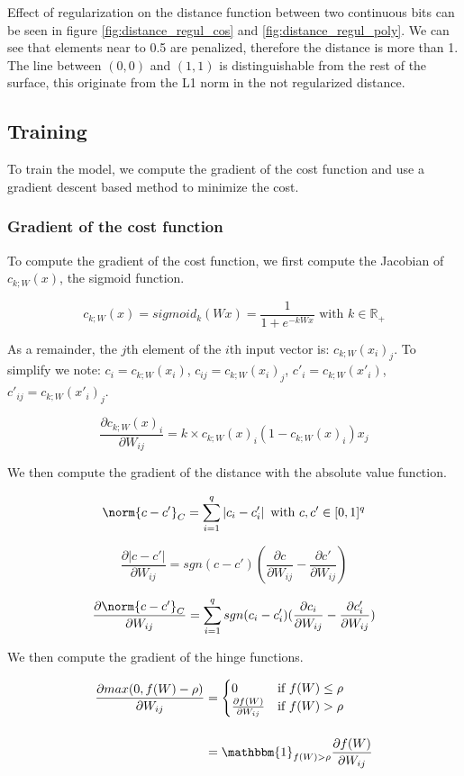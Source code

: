 Effect of regularization on the distance function between two continuous bits can be seen in figure \ref{fig:distance_regul_cos} and \ref{fig:distance_regul_poly}. We can see that elements near to 0.5 are penalized, therefore the distance is more than 1. The line between $(0, 0)$ and $(1, 1)$ is distinguishable from the rest of the surface, this originate from the L1 norm in the not regularized distance.

\subsection{Training}
To train the model, we compute the gradient of the cost function and use a gradient descent based method to minimize the cost.

\subsubsection{Gradient of the cost function}
To compute the gradient of the cost function, we first compute the Jacobian of $c_{k;W}(x)$, the sigmoid function.

\[c_{k;W}(x) = sigmoid_k(Wx) = \frac{1}{1 + e^{-kWx}} \text{ with } k \in \mathbb{R}_+\]

As a remainder, the $j$th element of the $i$th input vector is: $c_{k;W}(x_i)_j$. To simplify we note: $c_i = c_{k;W}(x_i)$, $c_{ij} = c_{k;W}(x_i)_j$, $c'_i = c_{k;W}(x'_i)$, $c'_{ij} = c_{k;W}(x'_i)_j$.

\[\frac{\partial c_{k;W}(x)_i}{\partial W_{ij}} = k \times c_{k;W}(x)_i(1 - c_{k;W}(x)_i)x_j\]

We then compute the gradient of the distance with the absolute value function.

\[\norm{c - c'}_{C} = \sum\limits_{i=1}^q \left|c_i-c'_i\right| \text{ with } c, c' \in [0, 1]^{q}\]

\[\frac{\partial \left|c-c'\right|}{\partial W_{ij}} = sgn(c-c')(\frac{\partial c}{\partial W_{ij}} - \frac{\partial c'}{\partial W_{ij}})\]

\[\frac{\partial \norm{c - c'}_{C}}{\partial W_{ij}} = \sum\limits_{i=1}^q sgn(c_i-c'_i)(\frac{\partial c_i}{\partial W_{ij}} - \frac{\partial c'_i}{\partial W_{ij}})\]

We then compute the gradient of the hinge functions.

\[
	\begin{split}
		\frac{\partial max(0, f(W) - \rho)}{\partial W_{ij}} & =
		\begin{cases}
		0                                     & \text{if } f(W) \leq \rho \\
		\frac{\partial f(W)}{\partial W_{ij}} & \text{if } f(W) > \rho
		\end{cases} \\[3ex]
		& = \mathbbm{1}_{f(W) > \rho} \frac{\partial f(W)}{\partial W_{ij}}
	\end{split}
\]

